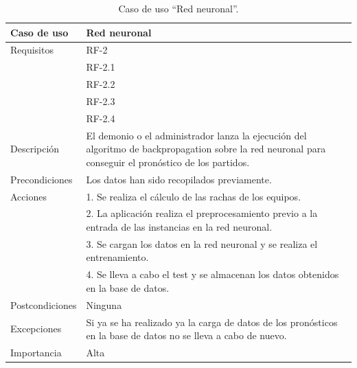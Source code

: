  \begin{table}
  \begin{center}
   \begin{tabular}{|p{3cm} | p{9cm} |}
    \hline
    Caso de uso & Red neuronal\\
    \hline
    Requisitos & RF-2\\
	    & RF-2.1\\
	    & RF-2.2\\
    	& RF-2.3\\
    	& RF-2.4\\
    \hline
    Descripción & El demonio o el administrador lanza la ejecución del algoritmo de backpropagation sobre la red neuronal para conseguir el pronóstico de los partidos.\\
    \hline
    Precondiciones &Los datos han sido recopilados previamente.\\
    \hline
    Acciones & 1. Se realiza el cálculo de las rachas de los equipos. \\
    &2. La aplicación realiza el preprocesamiento previo a la entrada de las instancias en la red neuronal.\\
    &3. Se cargan los datos en la red neuronal y se realiza el entrenamiento.\\
    &4. Se lleva a cabo el test y se almacenan los datos obtenidos en la base de datos.\\
    \hline
    Postcondiciones & Ninguna \\
    \hline
    Excepciones & Si ya se ha realizado ya la carga de datos de los pronósticos en la base de datos no se lleva a cabo de nuevo. \\
    \hline
    Importancia & Alta \\
    \hline
   \end{tabular}
   \caption{Caso de uso ``Red neuronal''.}
   \label{tabla:casoUso2}
  \end{center}
 \end{table} 
 
